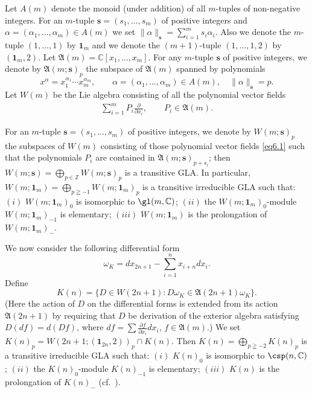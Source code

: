 Let $A(m)$ denote the monoid (under addition) of all $m$-tuples of
non-negative integers.
For an $m$-tuple
$\bm s=(s_1,\dots,s_m)$ of positive integers and
$\alpha=(\alpha_1,\dots,\alpha_m)\in A(m)$
we set $\|\alpha\|_{\bm s}=\sum\limits_{i=1}^ms_i\alpha_i$.
Also we denote the $m$-tuple $(1,\dots,1)$ by ${\bm 1}_m$
and  we denote the
$(m+1)$-tuple $(1,\dots,1,2)$ by $({\bm 1}_m,2)$.
Let $\mathfrak A(m)=\mathbb C[x_1,\dots,x_m]$.
For any $m$-tuple $\bm s$
of positive integers, we denote by $\mathfrak A(m;\bm s)_p$
the subspace of $\mathfrak A(m)$ spanned by polynomials
\[
x^{\alpha}=x_1^{\alpha_1}\cdots x_m^{\alpha_m}, \qquad
 \alpha=(\alpha_1,\dots,\alpha_m)\in A(m),\quad  \|\alpha\|_{\bm s}=p .
\]
Let $W(m)$ be the Lie algebra consisting of all the polynomial vector f\/ields
\begin{gather}\label{eq6.1}
\sum\limits_{i=1}^m P_i\frac{\partial}{\partial x_i},
\qquad  P_i\in\mathfrak A(m) .
\end{gather}

For an $m$-tuple $\bm s=(s_1,\dots,s_m)$ of positive integers,
we denote by $W(m;\bm s)_p$
the subspaces of $W(m)$ consisting of those polynomial vector f\/ields \eqref{eq6.1}
such that the polynomials $P_i$ are contained in
$\mathfrak A(m;\bm s)_{p+s_i}$;
then
$W(m;\bm s)=\bigoplus\limits_{p\in\mathbb Z}W(m;\bm s)_p$
is a transitive GLA.
In particular, $W(m;{\bm 1}_m)=\bigoplus\limits_{p\geqq-1}W(m;{\bm 1}_m)_p$ is
a transitive irreducible GLA
such that: $(i)$ $W(m;{\bm 1}_m)_0$ is isomorphic to $\gl(m,\mathbb C)$;
$(ii)$ the $W(m;{\bm 1}_m)_0$-module $W(m;{\bm 1}_m)_{-1}$ is elementary; $(iii)$
$W(m;{\bm 1}_m)$ is the prolongation of $W(m;{\bm 1}_m)_-$.

We now consider the following dif\/ferential form
\[
\omega_K=dx_{2n+1}-\sum_{i=1}^nx_{i+n}dx_{i}.
\]
Def\/ine
\[
K(n)=\{ D\in W(2n+1):D\omega_K\in\mathfrak A(2n+1)\omega_K \}.
\]
(Here the action of $D$ on the dif\/ferential forms is extended from
its action $\mathfrak A(2n+1)$ by requiring that $D$ be derivation of
the exterior algebra satisfying $D(df)=d(Df)$, where
$df=\sum\frac{\partial f}{\partial x_i}dx_i$, $f\in\mathfrak A(m)$.)
We set $K(n)_p=W(2n+1;({\bm 1}_{2n},2))_p\cap K(n)$.
Then $K(n)=\bigoplus\limits_{p\geqq-2}K(n)_p$
is a transitive irreducible GLA
such that: $(i)$
$K(n)_0$ is isomorphic to $\csp(n,\mathbb C)$;
$(ii)$ the $K(n)_0$-module $K(n)_{-1}$ is elementary;
$(iii)$ $K(n)$ is the prolongation of $K(n)_-$
(cf.~\cite{kac68:1, mor88:1}).

